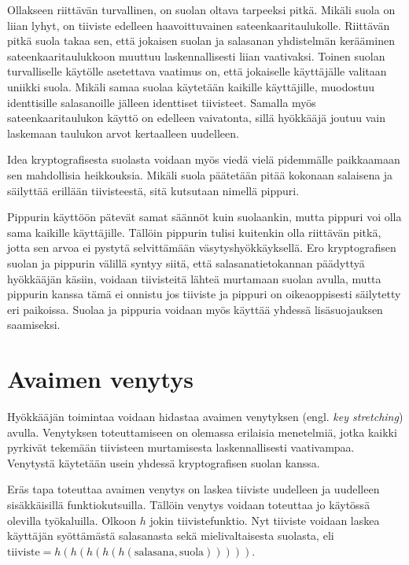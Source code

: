 Ollakseen riittävän turvallinen, on suolan oltava tarpeeksi pitkä. Mikäli suola on liian lyhyt, on tiiviste edelleen haavoittuvainen sateenkaaritaulukolle. Riittävän pitkä suola takaa sen, että jokaisen suolan ja salasanan yhdistelmän kerääminen sateenkaaritaulukkoon muuttuu laskennallisesti liian vaativaksi. Toinen suolan turvalliselle käytölle asetettava vaatimus on, että jokaiselle käyttäjälle valitaan uniikki suola. Mikäli samaa suolaa käytetään kaikille käyttäjille, muodostuu identtisille salasanoille jälleen identtiset tiivisteet. Samalla myös sateenkaaritaulukon käyttö on edelleen vaivatonta, sillä hyökkääjä joutuu vain laskemaan taulukon arvot kertaalleen uudelleen.

Idea kryptografisesta suolasta voidaan myös viedä vielä pidemmälle paikkaamaan sen mahdollisia heikkouksia. Mikäli suola päätetään pitää kokonaan salaisena ja säilyttää erillään tiivisteestä, sitä kutsutaan nimellä pippuri.

Pippurin käyttöön pätevät samat säännöt kuin suolaankin, mutta pippuri voi olla sama kaikille käyttäjille. Tällöin pippurin tulisi kuitenkin olla riittävän pitkä, jotta sen arvoa ei pystytä selvittämään väsytyshyökkäyksellä. Ero kryptografisen suolan ja pippurin välillä syntyy siitä, että salasanatietokannan päädyttyä hyökkääjän käsiin, voidaan tiivisteitä lähteä murtamaan suolan avulla, mutta pippurin kanssa tämä ei onnistu jos tiiviste ja pippuri on oikeaoppisesti säilytetty eri paikoissa. Suolaa ja pippuria voidaan myös käyttää yhdessä lisäsuojauksen saamiseksi.

\section{Avaimen venytys\label{sec:avaimen_venytys}}

Hyökkääjän toimintaa voidaan hidastaa avaimen venytyksen (engl. \textit{key stretching}) avulla. Venytyksen toteuttamiseen on olemassa erilaisia menetelmiä, jotka kaikki pyrkivät tekemään tiivisteen murtamisesta laskennallisesti vaativampaa. Venytystä käytetään usein yhdessä kryptografisen suolan kanssa.

Eräs tapa toteuttaa avaimen venytys on laskea tiiviste uudelleen ja uudelleen sisäkkäisillä funktiokutsuilla. Tällöin venytys voidaan toteuttaa jo käytössä olevilla työkaluilla. Olkoon $h$ jokin tiivistefunktio. Nyt tiiviste voidaan laskea käyttäjän syöttämästä salasanasta sekä mielivaltaisesta suolasta, eli $\text{tiiviste} = h(h(h(h(h(\text{salasana}, \text{suola})))))$.

